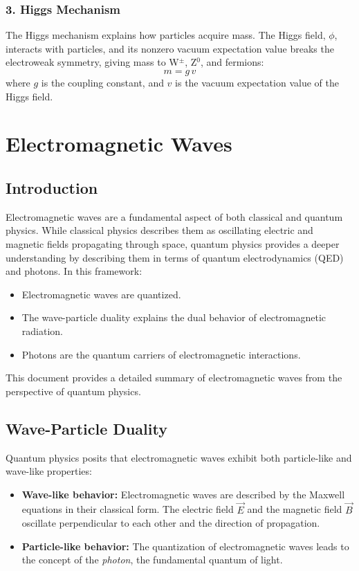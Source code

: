 \subsubsection{3. Higgs Mechanism}
The Higgs mechanism explains how particles acquire mass. The Higgs field, $\phi$, interacts with particles, and its nonzero vacuum expectation value breaks the electroweak symmetry, giving mass to W$^\pm$, Z$^0$, and fermions:
\[
m = g \, v
\]
where $g$ is the coupling constant, and $v$ is the vacuum expectation value of the Higgs field.


\section{Electromagnetic Waves}
\subsection{Introduction}
Electromagnetic waves are a fundamental aspect of both classical and quantum physics. While classical physics describes them as oscillating electric and magnetic fields propagating through space, quantum physics provides a deeper understanding by describing them in terms of quantum electrodynamics (QED) and photons. In this framework:
\begin{itemize}
    \item Electromagnetic waves are quantized.
    \item The wave-particle duality explains the dual behavior of electromagnetic radiation.
    \item Photons are the quantum carriers of electromagnetic interactions.
\end{itemize}

This document provides a detailed summary of electromagnetic waves from the perspective of quantum physics.

\subsection{Wave-Particle Duality}
Quantum physics posits that electromagnetic waves exhibit both particle-like and wave-like properties:
\begin{itemize}
    \item \textbf{Wave-like behavior:} Electromagnetic waves are described by the Maxwell equations in their classical form. The electric field $\vec{E}$ and the magnetic field $\vec{B}$ oscillate perpendicular to each other and the direction of propagation.
    \item \textbf{Particle-like behavior:} The quantization of electromagnetic waves leads to the concept of the \textit{photon}, the fundamental quantum of light.
\end{itemize}

